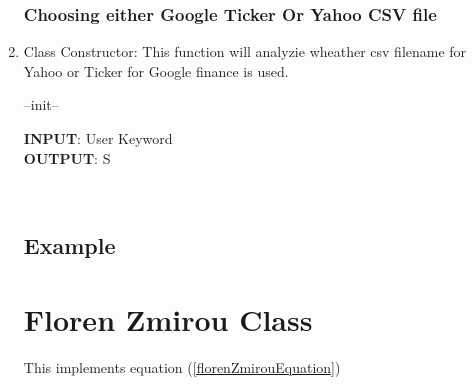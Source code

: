 \begin{enumerate}
\subsubsection{ Choosing either Google Ticker Or Yahoo CSV file}
\item  Class Constructor: This function will analyzie wheather csv filename for Yahoo or Ticker 
for Google finance is used.
\begin{algorithm}
\caption{--init--}
\bigskip
\textbf{INPUT}: User Keyword  \\
\textbf{OUTPUT}: S 
\begin{algorithmic}[1]
  \\
\end{algorithmic}
\end{algorithm}
\subsection {Example}
\newpage
\section{Floren Zmirou Class}
This implements equation (\ref{florenZmirouEquation})

\end{enumerate}
